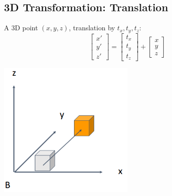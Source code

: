\documentclass[10pt]{article}
\begin{document}
\subsection*{3D Transformation: Translation}
A 3D point $(x, y, z)$, translation by $t_x, t_y, t_z$:
\[\begin{bmatrix} x' \\ y' \\ z' \end{bmatrix} = \begin{bmatrix} t_x \\ t_y \\ t_z \end{bmatrix} + \begin{bmatrix} x \\ y \\ z \end{bmatrix}\]
\begin{center} 
	\includegraphics*[width=0.5\textwidth]{L1_6.png} 
\end{center}
\end{document}
